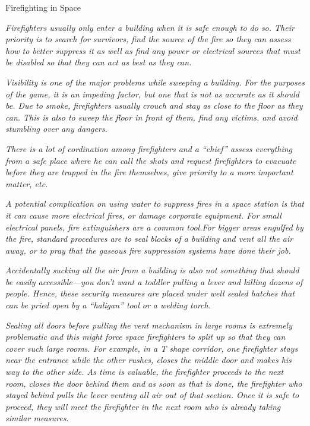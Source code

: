 \medskip
\begin{rpg-commentbox}{Firefighting in Space}
\begin{small}
    \textit{Firefighters usually only enter a building when it is safe enough to do so. Their priority is to search for survivors, find the source of the fire so they can assess how to better suppress it as well as find any power or electrical sources that must be disabled so that they can act as best as they can.}

    \textit{Visibility is one of the major problems while sweeping a building. For the purposes of the game, it is an impeding factor, but one that is not as accurate as it should be. Due to smoke, firefighters usually crouch and stay as close to the floor as they can. This is also to sweep the floor in front of them, find any victims, and avoid stumbling over any dangers.}

    \textit{There is a lot of cordination among firefighters and a ``chief'' assess everything from a safe place where he can call the shots and request firefighters to evacuate before they are trapped in the fire themselves, give priority to a more important matter, etc.}

    \textit{A potential complication on using water to suppress fires in a space station is that it can cause more electrical fires, or damage corporate equipment. For small electrical panels, fire extinguishers are a common tool.For bigger areas engulfed by the fire, standard procedures are to seal blocks of a building and vent all the air away, or to pray that the gaseous fire suppression systems have done their job. }

    \textit{Accidentally sucking all the air from a building is also not something that should be easily accessible---you don't want a toddler pulling a lever and killing dozens of people. Hence, these security measures are placed under well sealed hatches that can be pried open by a ``haligan'' tool or a welding torch.  }

    \textit{Sealing all doors before pulling the vent mechanism in large rooms is extremely problematic and this might force space firefighters to split up so that they can cover such large rooms. For example, in a T shape corridor, one firefighter stays near the entrance while the other rushes, closes the middle door and makes his way to the other side. As time is valuable, the firefighter proceeds to the next room, closes the door behind them and as soon as that is done, the firefighter who stayed behind pulls the lever venting all air out of that section. Once it is safe to proceed, they will meet the firefighter in the next room who is already taking similar measures.}


\end{small}
\end{rpg-commentbox}

